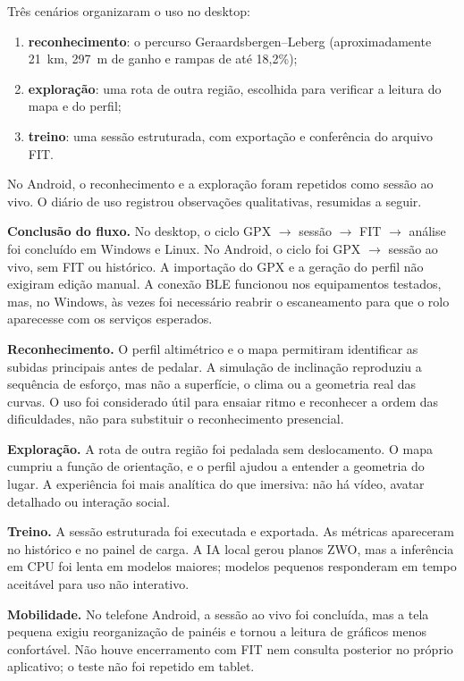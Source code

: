 Três cenários organizaram o uso no desktop:

\begin{enumerate}
    \item \textbf{reconhecimento}: o percurso Geraardsbergen--Leberg
        (aproximadamente 21~km, 297~m de ganho e rampas de até 18,2\%);
    \item \textbf{exploração}: uma rota de outra região, escolhida para
        verificar a leitura do mapa e do perfil;
    \item \textbf{treino}: uma sessão estruturada, com exportação e conferência
        do arquivo FIT.
\end{enumerate}

No Android, o reconhecimento e a exploração foram repetidos como sessão ao vivo.
O diário de uso registrou observações qualitativas, resumidas a seguir.

\textbf{Conclusão do fluxo.} No desktop, o ciclo GPX \(\rightarrow\) sessão
\(\rightarrow\) FIT \(\rightarrow\) análise foi concluído em Windows e Linux. No
Android, o ciclo foi GPX \(\rightarrow\) sessão ao vivo, sem FIT ou histórico. A
importação do GPX e a geração do perfil não exigiram edição manual. A conexão
BLE funcionou nos equipamentos testados, mas, no Windows, às vezes foi
necessário reabrir o escaneamento para que o rolo aparecesse com os serviços
esperados.

\textbf{Reconhecimento.} O perfil altimétrico e o mapa permitiram identificar as
subidas principais antes de pedalar. A simulação de inclinação reproduziu a
sequência de esforço, mas não a superfície, o clima ou a geometria real das
curvas. O uso foi considerado útil para ensaiar ritmo e reconhecer a ordem das
dificuldades, não para substituir o reconhecimento presencial.

\textbf{Exploração.} A rota de outra região foi pedalada sem deslocamento. O
mapa cumpriu a função de orientação, e o perfil ajudou a entender a geometria do
lugar. A experiência foi mais analítica do que imersiva: não há vídeo, avatar
detalhado ou interação social.

\textbf{Treino.} A sessão estruturada foi executada e exportada. As métricas
apareceram no histórico e no painel de carga. A IA local gerou planos ZWO, mas
a inferência em CPU foi lenta em modelos maiores; modelos pequenos responderam
em tempo aceitável para uso não interativo.

\textbf{Mobilidade.} No telefone Android, a sessão ao vivo foi concluída, mas a
tela pequena exigiu reorganização de painéis e tornou a leitura de gráficos
menos confortável. Não houve encerramento com FIT nem consulta posterior no
próprio aplicativo; o teste não foi repetido em tablet.


